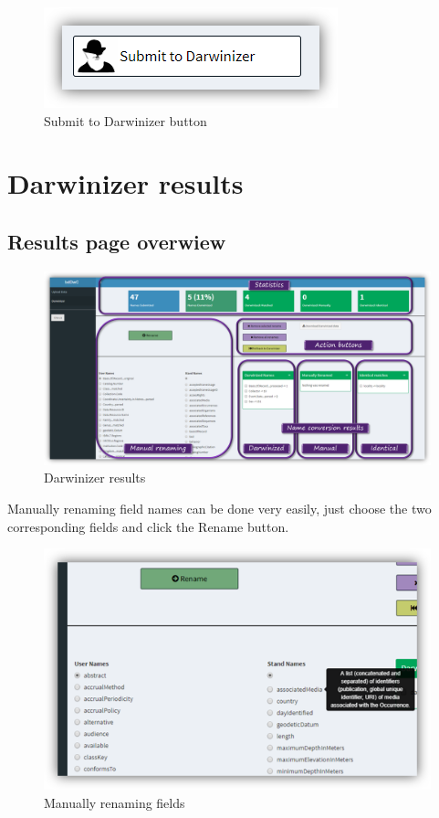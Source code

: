 \documentclass[]{book}
\theoremstyle{definition}
\theoremstyle{definition}
\theoremstyle{definition}
\theoremstyle{remark}
\begin{document}
\begin{figure}
\centering
\includegraphics{img/bdDwC_Submit.png}
\caption{Submit to Darwinizer button}
\end{figure}

\section{Darwinizer results}\label{darwinizer-results}

\subsection{Results page overwiew}\label{results-page-overwiew}

\begin{figure}
\centering
\includegraphics{img/bdDwC_Darwinizer_results.png}
\caption{Darwinizer results}
\end{figure}

Manually renaming field names can be done very easily, just choose the
two corresponding fields and click the Rename button.

\begin{figure}
\centering
\includegraphics{img/bdDwC_Manual_rename.png}
\caption{Manually renaming fields}
\end{figure}
\end{document}
